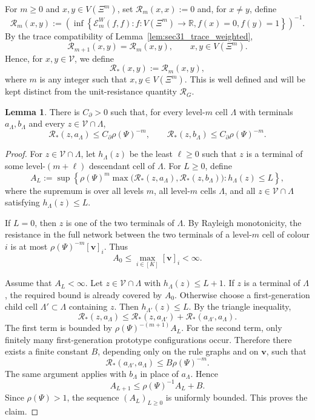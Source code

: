 \documentclass{article}
\theoremstyle{plain}
\theoremstyle{definition}
\newtheorem{lemma}[theorem]{Lemma}
\newcommand{\Reff}{\mathscr{R}}
\begin{document}
For $m\ge 0$ and $x,y\in V(\Xi^m)$, set $\Reff_m(x,x):=0$ and, for $x\ne y$, define
\[
\Reff_m(x,y)
:=
\left(
\inf\left\{
\mathcal E_m^W(f,f):
 f:V(\Xi^m)\to\mathbb R,
 f(x)=0,
 f(y)=1
\right\}
\right)^{-1}.
\]
By the trace compatibility of Lemma~\ref{lem:sec31_trace_weighted},
\[
\Reff_{m+1}(x,y)=\Reff_m(x,y),
\qquad x,y\in V(\Xi^m).
\]
Hence, for $x,y\in\mathscr V$, we define
\[
\Reff_*(x,y):=\Reff_m(x,y),
\]
where $m$ is any integer such that $x,y\in V(\Xi^m)$.
This is well defined and will be kept distinct from the unit-resistance quantity $\Reff_G$.

\begin{lemma}\label{lem:sec32_point_boundary}
There is $C_\partial>0$ such that, for every level-$m$ cell $\Lambda$ with terminals $a_{\Lambda},b_{\Lambda}$ and every $z\in\mathscr V\cap\Lambda$,
\[
\Reff_*(z,a_{\Lambda})\le C_\partial\rho(\Psi)^{-m},
\qquad
\Reff_*(z,b_{\Lambda})\le C_\partial\rho(\Psi)^{-m}.
\]
\end{lemma}

\begin{proof}
For $z\in\mathscr V\cap\Lambda$, let $h_{\Lambda}(z)$ be the least $\ell\ge 0$ such that $z$ is a terminal of some level-$(m+\ell)$ descendant cell of $\Lambda$.
For $L\ge 0$, define
\[
A_L:=
\sup
\left\{
\rho(\Psi)^m
\max\bigl(
\Reff_*(z,a_{\Lambda}),
\Reff_*(z,b_{\Lambda})
\bigr):
 h_{\Lambda}(z)\le L
\right\},
\]
where the supremum is over all levels $m$, all level-$m$ cells $\Lambda$, and all $z\in\mathscr V\cap\Lambda$ satisfying $h_{\Lambda}(z)\le L$.

If $L=0$, then $z$ is one of the two terminals of $\Lambda$.
By Rayleigh monotonicity, the resistance in the full network between the two terminals of a level-$m$ cell of colour $i$ is at most $\rho(\Psi)^{-m}[\mathbf v]_i$.
Thus
\[
A_0\le \max_{i\in[K]}[\mathbf v]_i<\infty.
\]

Assume that $A_L<\infty$.
Let $z\in\mathscr V\cap\Lambda$ with $h_{\Lambda}(z)\le L+1$.
If $z$ is a terminal of $\Lambda$, the required bound is already covered by $A_0$.
Otherwise choose a first-generation child cell $\Lambda'\subset\Lambda$ containing $z$.
Then $h_{\Lambda'}(z)\le L$.
By the triangle inequality,
\[
\Reff_*(z,a_{\Lambda})
\le
\Reff_*(z,a_{\Lambda'})
+
\Reff_*(a_{\Lambda'},a_{\Lambda}).
\]
The first term is bounded by $\rho(\Psi)^{-(m+1)}A_L$.
For the second term, only finitely many first-generation prototype configurations occur.
Therefore there exists a finite constant $B$, depending only on the rule graphs and on $\mathbf v$, such that
\[
\Reff_*(a_{\Lambda'},a_{\Lambda})\le B\rho(\Psi)^{-m}.
\]
The same argument applies with $b_{\Lambda}$ in place of $a_{\Lambda}$.
Hence
\[
A_{L+1}\le \rho(\Psi)^{-1}A_L+B.
\]
Since $\rho(\Psi)>1$, the sequence $(A_L)_{L\ge 0}$ is uniformly bounded.
This proves the claim.
\end{proof}
\end{document}
